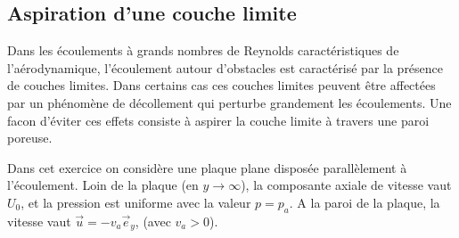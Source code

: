 \subsection{Aspiration d'une couche limite}

\begin{center}

\end{center}


Dans les écoulements à grands nombres de Reynolds caractéristiques
de l'aérodynamique, l'écoulement autour d'obstacles est caractérisé
par la présence de couches limites. Dans certains cas ces couches limites
peuvent être affectées par un phénomène de décollement qui perturbe
grandement les écoulements. Une facon d'éviter ces effets consiste à 
aspirer la couche limite à travers une paroi poreuse.

Dans cet exercice on considère une plaque plane disposée parallèlement
à l'écoulement. Loin de la plaque (en $y \rightarrow \infty$), 
la composante axiale de vitesse vaut $U_0$, et la pression est uniforme
avec la valeur $p=p_a$.
A la paroi de la plaque, la vitesse vaut $\vec u = -v_a \vec e_y$, 
(avec $v_a >0$). 


